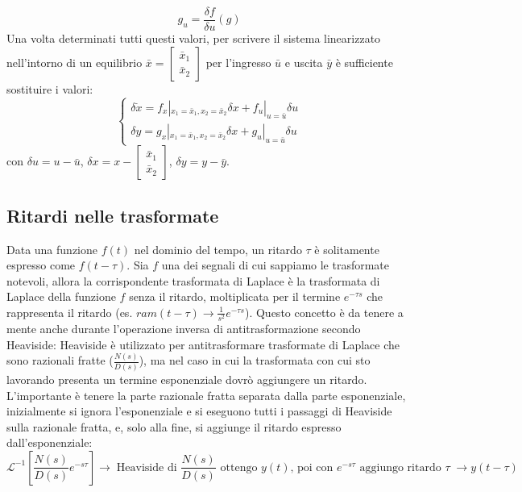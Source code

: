 \[
    g_u = \frac{\delta f}{\delta u} (g)
\]
Una volta determinati tutti questi valori, per scrivere il sistema linearizzato nell'intorno di un equilibrio $\bar{x} = \left[\begin{matrix}
    \bar{x}_1 \\ \bar{x}_2
\end{matrix}\right]$ per l'ingresso $\bar{u}$ e uscita $\bar{y}$ è sufficiente sostituire i valori:
\[
    \begin{cases}
        \delta \dot{x} = f_x|_{x_1 = \bar{x}_1, x_2 = \bar{x}_2} \delta x + f_u|_{u = \bar{u}}\delta u\\
        \delta y = g_x|_{x_1 = \bar{x}_1, x_2 = \bar{x}_2} \delta x + g_u|_{u = \bar{u}} \delta u
    \end{cases}
\]
con $ \delta u = u - \bar{u}$, $\delta x = x -\left[\begin{matrix}
    \bar{x}_1 \\ \bar{x}_2
\end{matrix}\right]$, $ \delta y = y - \bar{y}$.
\subsection{Ritardi nelle trasformate}
Data una funzione $f(t)$ nel dominio del tempo, un ritardo $\tau$ è solitamente espresso come $f(t-\tau)$. Sia $f$ una dei segnali di cui sappiamo le trasformate notevoli, allora la corrispondente trasformata di Laplace è la trasformata di Laplace della funzione $f$ senza il ritardo, moltiplicata per il termine $e^{- \tau s}$ che rappresenta il ritardo (es. $ram(t-\tau) \rightarrow \frac{1}{s^2}e^{- \tau s}$).\newline
\newline
Questo concetto è da tenere a mente anche durante l'operazione inversa di antitrasformazione secondo Heaviside: Heaviside è utilizzato per antitrasformare trasformate di Laplace che sono razionali fratte ($\frac{N(s)}{D(s)}$), ma nel caso in cui la trasformata con cui sto lavorando presenta un termine esponenziale dovrò aggiungere un ritardo. L'importante è tenere la parte razionale fratta separata dalla parte esponenziale, inizialmente si ignora l'esponenziale e si eseguono tutti i passaggi di Heaviside sulla razionale fratta, e, solo alla fine, si aggiunge il ritardo espresso dall'esponenziale:
\[
    \mathcal{L}^{-1}[\frac{N(s)}{D(s)}e^{-s \tau}] \rightarrow \;\text{Heaviside di $\frac{N(s)}{D(s)}$ ottengo $y(t)$, poi con $e^{-s \tau}$ aggiungo ritardo $\tau$}\; \rightarrow  y(t- \tau)
\]